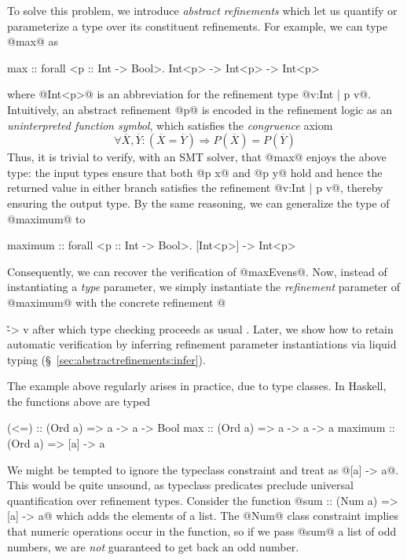 {{To solve this problem, we introduce \emph{abstract refinements} 
which let us 
quantify or parameterize a type over its constituent refinements.
For example, we can type @max@ as
\begin{code}
  max :: forall <p :: Int -> Bool>. Int<p> -> Int<p> -> Int<p>
\end{code}
where @Int<p>@ is an abbreviation for the refinement type {@{v:Int | p v}@}.
Intuitively, an abstract refinement @p@ is encoded in the refinement logic 
as an \emph{uninterpreted function symbol}, which satisfies the
\emph{congruence} axiom~\cite{Nelson81}
%
$$\forall \overline{X}, \overline{Y}: (\overline{X} = \overline{Y})
\Rightarrow P(\overline{X}) = P(\overline{Y})$$
%
Thus, it is trivial to verify, with an SMT solver, that @max@ 
enjoys the above type: the input types ensure that both @p x@ and @p y@ 
hold and hence the returned value in either branch satisfies 
the refinement  @{v:Int | p v}@, thereby ensuring the output 
type. By the same reasoning, we can generalize the type of @maximum@ 
to
\begin{code}
  maximum :: forall <p :: Int -> Bool>. [Int<p>] -> Int<p>
\end{code}
Consequently, we can recover the verification of @maxEvens@.
Now, instead of instantiating a \emph{type} parameter, we simply instantiate
the \emph{refinement} parameter of @maximum@ with the concrete 
refinement 
@{\v -> v %
after which type checking proceeds as usual \cite{LiquidPLDI08}. 
%
Later, we show how to retain automatic verification by inferring
refinement parameter instantiations via liquid typing
(\S~\ref{sec:abstractrefinements:infer}).

The example above regularly arises in practice, due to type classes. 
In Haskell, the functions above are typed
%
\begin{code}
  (<=)    :: (Ord a) => a -> a -> Bool
  max     :: (Ord a) => a -> a -> a
  maximum :: (Ord a) => [a] -> a
\end{code}
%
We might be tempted to ignore the typeclass constraint 
and treat  as @[a] -> a@. 
This would be quite unsound, as typeclass predicates preclude
universal quantification over refinement types. 
Consider the function @sum :: (Num a) => [a] -> a@ which adds the elements 
of a list.
The @Num@ class constraint implies that numeric operations occur 
in the function, so
if we pass @sum@ a list of odd numbers, 
we are \emph{not} guaranteed to get back an odd number. 

}}}
